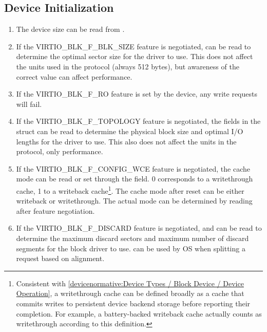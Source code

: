 \subsection{Device Initialization}\label{sec:Device Types / Block Device / Device Initialization}

\begin{enumerate}
\item The device size can be read from .

\item If the VIRTIO_BLK_F_BLK_SIZE feature is negotiated,
   can be read to determine the optimal sector size
  for the driver to use. This does not affect the units used in
  the protocol (always 512 bytes), but awareness of the correct
  value can affect performance.

\item If the VIRTIO_BLK_F_RO feature is set by the device, any write
  requests will fail.

\item If the VIRTIO_BLK_F_TOPOLOGY feature is negotiated, the fields in the
   struct can be read to determine the physical block size and optimal
  I/O lengths for the driver to use. This also does not affect the units
  in the protocol, only performance.

\item If the VIRTIO_BLK_F_CONFIG_WCE feature is negotiated, the cache
  mode can be read or set through the  field.  0 corresponds
  to a writethrough cache, 1 to a writeback cache\footnote{Consistent with
    \ref{devicenormative:Device Types / Block Device / Device Operation},
    a writethrough cache can be defined broadly as a cache that commits
    writes to persistent device backend storage before reporting their
    completion. For example, a battery-backed writeback cache actually
    counts as writethrough according to this definition.}.  The cache mode
  after reset can be either writeback or writethrough.  The actual
  mode can be determined by reading  after feature
  negotiation.

\item If the VIRTIO_BLK_F_DISCARD feature is negotiated,
     and  can be read
    to determine the maximum discard sectors and maximum number of discard
    segments for the block driver to use. 
    can be used by OS when splitting a request based on alignment.


\end{enumerate}
